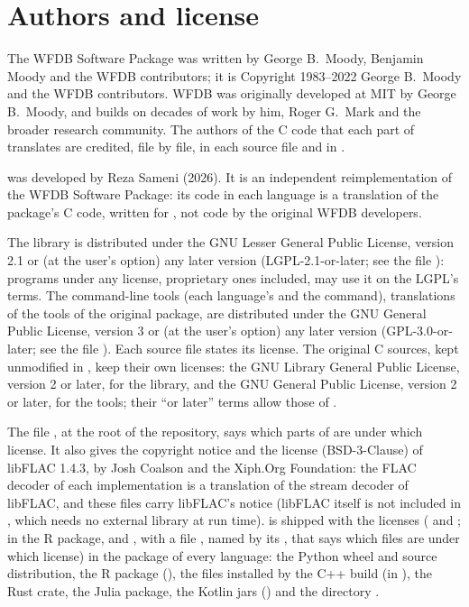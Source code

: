 \section{Authors and license}
\label{sec:license}

The WFDB Software Package was written by George B.~Moody, Benjamin Moody and
the WFDB contributors; it is Copyright \textcopyright{} 1983--2022 George
B.~Moody and the WFDB contributors. WFDB was originally developed at MIT by
George B.~Moody, and builds on decades of work by him, Roger G.~Mark and the
broader research community. The authors of the C code that each part of
\wfdbx{} translates are credited, file by file, in each \wfdbx{} source file
and in .

\wfdbx{} was developed by Reza Sameni (2026). It is an independent
reimplementation of the WFDB Software Package: its code in each language is a
translation of the package's C code, written for \wfdbx{}, not code by the
original WFDB developers.

The \wfdbx{} library is distributed under the GNU Lesser General Public
License, version 2.1 or (at the user's option) any later version
(LGPL-2.1-or-later; see the file ): programs under any license,
proprietary ones included, may use it on the LGPL's terms. The command-line
tools (each language's  and the  command), translations
of the tools of the original package, are distributed under the GNU General
Public License, version 3 or (at the user's option) any later version
(GPL-3.0-or-later; see the file ). Each source file states
its license. The original C sources, kept unmodified in
, keep their own licenses: the GNU Library General Public
License, version 2 or later, for the library, and the GNU General Public
License, version 2 or later, for the tools; their ``or later'' terms allow
those of \wfdbx{}.

The file , at the root of the repository, says which parts of
\wfdbx{} are under which license. It also gives the copyright notice and the
license (BSD-3-Clause) of libFLAC 1.4.3, by Josh Coalson and the Xiph.Org
Foundation: the FLAC decoder of each implementation is a translation of the
stream decoder of libFLAC, and these files carry libFLAC's notice (libFLAC
itself is not included in \wfdbx{}, which needs no external library at run
time).  is shipped with the licenses ( and
; in the R package,  and
, with a file , named by its
, that says which files are under which
license) in the package of every language: the Python wheel and source
distribution, the R package (), the files
installed by the C++ build (in ), the Rust crate, the
Julia package, the Kotlin jars () and the directory
.
